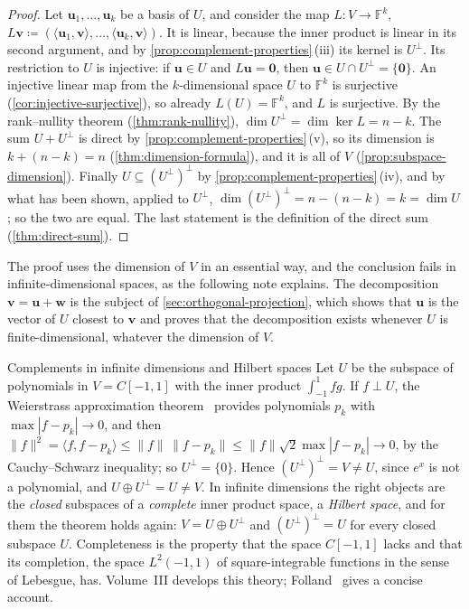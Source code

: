 \begin{proof}
Let $\mathbf u_1,\ldots,\mathbf u_k$ be a basis of $U$, and consider the map $L\colon V\to\mathbb F^k$, $L\mathbf v\coloneqq(\langle\mathbf u_1,\mathbf v\rangle,\ldots,\langle\mathbf u_k,\mathbf v\rangle)$. It is linear, because the inner product is linear in its second argument, and by \cref{prop:complement-properties}\,(iii) its kernel is $U^\perp$. Its restriction to $U$ is injective: if $\mathbf u\in U$ and $L\mathbf u=\mathbf 0$, then $\mathbf u\in U\cap U^\perp=\{\mathbf 0\}$. An injective linear map from the $k$-dimensional space $U$ to $\mathbb F^k$ is surjective (\cref{cor:injective-surjective}), so already $L(U)=\mathbb F^k$, and $L$ is surjective. By the rank--nullity theorem (\cref{thm:rank-nullity}), $\dim U^\perp=\dim\ker L=n-k$. The sum $U+U^\perp$ is direct by \cref{prop:complement-properties}\,(v), so its dimension is $k+(n-k)=n$ (\cref{thm:dimension-formula}), and it is all of $V$ (\cref{prop:subspace-dimension}). Finally $U\subseteq(U^\perp)^\perp$ by \cref{prop:complement-properties}\,(iv), and by what has been shown, applied to $U^\perp$, $\dim(U^\perp)^\perp=n-(n-k)=k=\dim U$; so the two are equal. The last statement is the definition of the direct sum (\cref{thm:direct-sum}).
\end{proof}

The proof uses the dimension of $V$ in an essential way, and the conclusion fails in infinite-dimensional spaces, as the following note explains. The decomposition $\mathbf v=\mathbf u+\mathbf w$ is the subject of \cref{sec:orthogonal-projection}, which shows that $\mathbf u$ is the vector of $U$ closest to $\mathbf v$ and proves that the decomposition exists whenever $U$ is finite-dimensional, whatever the dimension of $V$.

\begin{note}{Complements in infinite dimensions and Hilbert spaces}
Let $U$ be the subspace of polynomials in $V=C[-1,1]$ with the inner product $\int_{-1}^1fg$. If $f\perp U$, the Weierstrass approximation theorem~\cite[Thm.~7.26]{rudin1976} provides polynomials $p_k$ with $\max|f-p_k|\to0$, and then $\|f\|^2=\langle f,f-p_k\rangle\le\|f\|\,\|f-p_k\|\le\|f\|\sqrt2\max|f-p_k|\to0$, by the Cauchy--Schwarz inequality; so $U^\perp=\{0\}$. Hence $(U^\perp)^\perp=V\ne U$, since $e^x$ is not a polynomial, and $U\oplus U^\perp=U\ne V$. In infinite dimensions the right objects are the \emph{closed} subspaces of a \emph{complete} inner product space, a \emph{Hilbert space}, and for them the theorem holds again: $V=U\oplus U^\perp$ and $(U^\perp)^\perp=U$ for every closed subspace $U$. Completeness is the property that the space $C[-1,1]$ lacks and that its completion, the space $L^2(-1,1)$ of square-integrable functions in the sense of Lebesgue, has. Volume~III develops this theory; Folland~\cite[Sect.~5.5]{folland1999} gives a concise account.
\end{note}

